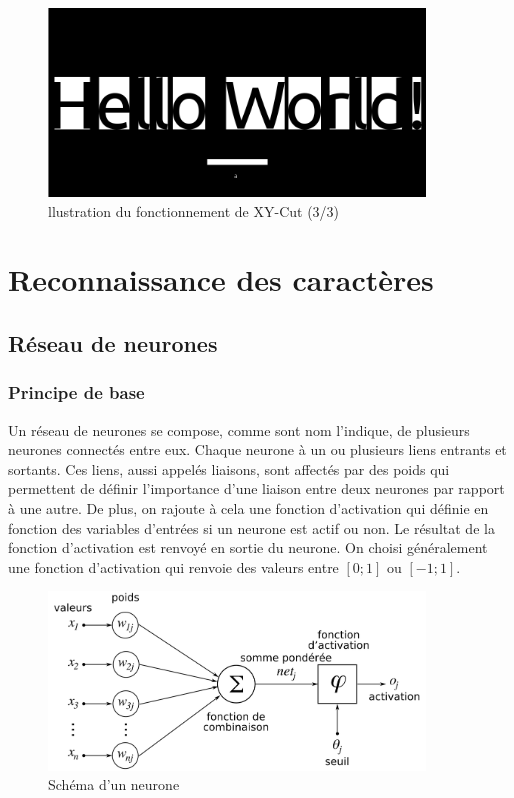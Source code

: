 \documentclass[11pt]{report}
\begin{document}
\begin{figure}[htbp]
\centering
\includegraphics[width=10cm]{3.png}
\caption{llustration du fonctionnement de XY-Cut (3/3)}
\end{figure}

\chapter{Reconnaissance des caractères}

\section{Réseau de neurones}

\subsection{Principe de base}

Un réseau de neurones se compose, comme sont nom l'indique, de plusieurs neurones connectés entre eux. Chaque neurone à un ou plusieurs liens entrants et sortants. Ces liens, aussi appelés liaisons, sont affectés par des poids qui permettent de définir l'importance d'une liaison entre deux neurones par rapport à une autre. De plus, on rajoute à cela une fonction d'activation qui définie en fonction des variables d'entrées si un neurone est actif ou non. Le résultat de la fonction d'activation est renvoyé en sortie du neurone. On choisi généralement une fonction d'activation qui renvoie des valeurs entre $[0; 1]$ ou $[-1; 1]$.

\begin{figure}[htbp]
\centering
\includegraphics[width=10cm]{perceptron.png}
\caption{Schéma d'un neurone}
\end{figure}
\end{document}
